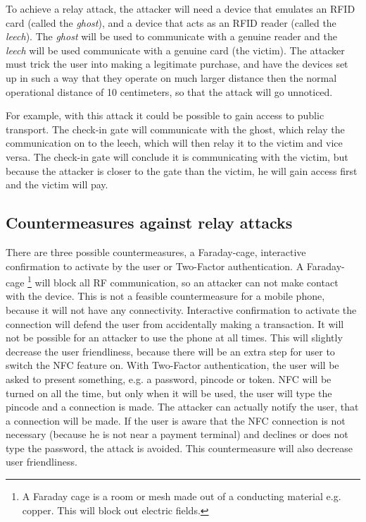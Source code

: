 To achieve a relay attack, the attacker will need a device that emulates an RFID card (called the \textit{ghost}), and a device that acts as an RFID reader (called the \textit{leech}).
The \textit{ghost} will be used to communicate with a genuine reader and the \textit{leech} will be used communicate with a genuine card (the victim).
The attacker must trick the user into making a legitimate purchase, and have the devices set up in such a way that they operate on much larger distance then the normal operational distance of 10 centimeters, so that the attack will go unnoticed. \cite{1128470}

For example, with this attack it could be possible to gain access to public transport.
The check-in gate will communicate with the ghost, which relay the communication on to the leech, which will then relay it to the victim and vice versa.
The check-in gate will conclude it is communicating with the victim, but because the attacker is closer to the gate than the victim, he will gain access first and the victim will pay.

\subsection{Countermeasures against relay attacks}
There are three possible countermeasures, a Faraday-cage, interactive confirmation to activate by the user or Two-Factor authentication.
A Faraday-cage \footnote{A Faraday cage is a room or mesh made out of a conducting material e.g. copper. This will block out electric fields.}  will block all RF communication, so an attacker can not make contact with the device.
This is not a feasible countermeasure for a mobile phone, because it will not have any connectivity.
Interactive confirmation to activate the connection will defend the user from accidentally making a transaction.
It will not be possible for an attacker to use the phone at all times.
This will slightly decrease the user friendliness, because there will be an extra step for user to switch the NFC feature on.
With Two-Factor authentication, the user will be asked to present something, e.g. a password, pincode or token.
NFC will be turned on all the time, but only when it will be used, the user will type the pincode and a connection is made.
The attacker can actually notify the user, that a connection will be made.
If the user is aware that the NFC connection is not necessary (because he is not near a payment terminal) and declines or does not type the password, the attack is avoided.
This countermeasure will also decrease user friendliness. \cite{1128470}

